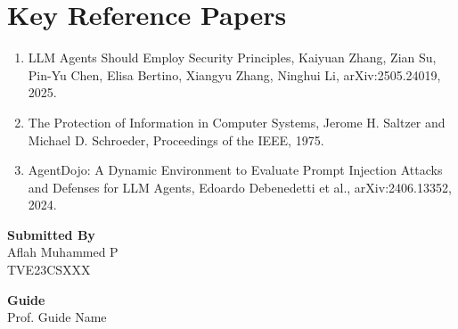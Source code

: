 \documentclass[12pt]{article}
\newcommand{\studentname}{Aflah Muhammed P}
\newcommand{\rollno}{TVE23CSXXX}
\newcommand{\guidename}{Prof. Guide Name}
\begin{document}
\section*{Key Reference Papers}
\begin{enumerate}
  \item LLM Agents Should Employ Security Principles, Kaiyuan Zhang, Zian Su, Pin-Yu Chen, Elisa Bertino, Xiangyu Zhang, Ninghui Li, arXiv:2505.24019, 2025.
  \item The Protection of Information in Computer Systems, Jerome H. Saltzer and Michael D. Schroeder, Proceedings of the IEEE, 1975.
  \item AgentDojo: A Dynamic Environment to Evaluate Prompt Injection Attacks and Defenses for LLM Agents, Edoardo Debenedetti et al., arXiv:2406.13352, 2024.
\end{enumerate}
\vspace{1.5em}

\noindent\textbf{Submitted By}\\
\studentname\\
\rollno

\vspace{1em}
\noindent\textbf{Guide}\\
\guidename
\end{document}

